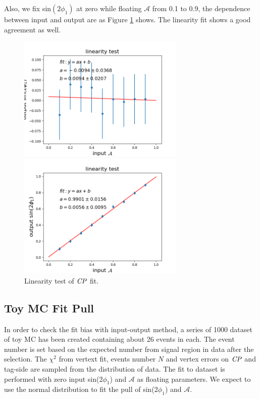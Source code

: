 Also, we fix sin$(2\phi_1)$ at zero while floating $\mathcal{A}$ from  0.1 to 0.9, the dependence between input and output are as Figure \ref{fig:cpfit_line_A} shows. The linearity fit shows a good agreement as well.
\begin{figure}[H]
	\begin{minipage}{0.5\linewidth}
		\includegraphics[height=6cm]{figures/S-test-line_fixS}
	\end{minipage}
	\begin{minipage}{0.5\linewidth}
		\includegraphics[height=6cm]{figures/A-test-line_fixS}
	\end{minipage}
	\caption{Linearity test of $\it{CP}$ fit.}
	\label{fig:cpfit_line_A}
\end{figure}

\subsection{Toy MC Fit Pull}
In order to check the fit bias with input-output method, a series of 1000 dataset of toy MC has been created containing about 26 events in each. The event number is set based on the expected number from signal region in data after the selection. The $\chi^2$ from vertext fit, events number $N$ and vertex errors on $\it{CP}$ and tag-side are sampled from the distribution of data. The fit to dataset is performed with zero input sin(2$\phi_1$) and $\mathcal{A}$ as floating parameters.
We expect to use the normal distribution to fit the pull of sin(2$\phi_1$) and $\mathcal{A}$. 

